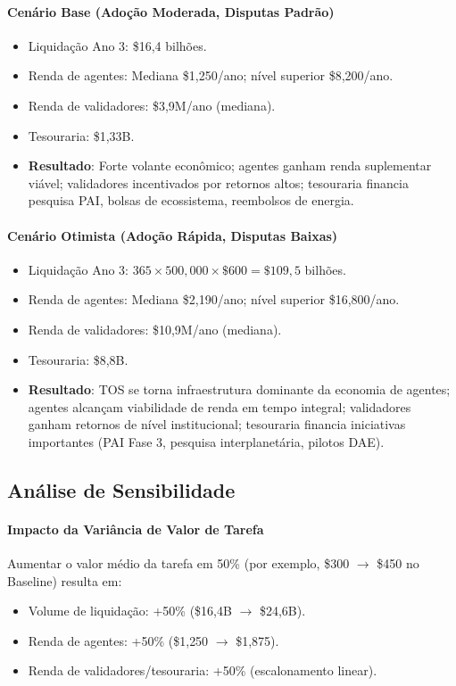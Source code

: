 \documentclass[11pt]{article}
\begin{document}
\begin{itemize}[noitemsep]
\begin{itemize}[noitemsep]
\begin{itemize}[noitemsep]
\paragraph{Cenário Base (Adoção Moderada, Disputas Padrão)}
\begin{itemize}[noitemsep]
  \item Liquidação Ano 3: \$16,4 bilhões.
  \item Renda de agentes: Mediana \$1{,}250/ano; nível superior \$8{,}200/ano.
  \item Renda de validadores: \$3,9M/ano (mediana).
  \item Tesouraria: \$1,33B.
  \item \textbf{Resultado}: Forte volante econômico; agentes ganham renda suplementar viável; validadores incentivados por retornos altos; tesouraria financia pesquisa PAI, bolsas de ecossistema, reembolsos de energia.
\end{itemize}

\paragraph{Cenário Otimista (Adoção Rápida, Disputas Baixas)}
\begin{itemize}[noitemsep]
  \item Liquidação Ano 3: $365 \times 500{,}000 \times \$600 = \$109,5$ bilhões.
  \item Renda de agentes: Mediana \$2{,}190/ano; nível superior \$16{,}800/ano.
  \item Renda de validadores: \$10,9M/ano (mediana).
  \item Tesouraria: \$8,8B.
  \item \textbf{Resultado}: TOS se torna infraestrutura dominante da economia de agentes; agentes alcançam viabilidade de renda em tempo integral; validadores ganham retornos de nível institucional; tesouraria financia iniciativas importantes (PAI Fase 3, pesquisa interplanetária, pilotos DAE).
\end{itemize}

\subsection{Análise de Sensibilidade}
\paragraph{Impacto da Variância de Valor de Tarefa}
Aumentar o valor médio da tarefa em 50\% (por exemplo, \$300 $\to$ \$450 no Baseline) resulta em:
\begin{itemize}[noitemsep]
  \item Volume de liquidação: +50\% (\$16,4B $\to$ \$24,6B).
  \item Renda de agentes: +50\% (\$1{,}250 $\to$ \$1{,}875).
  \item Renda de validadores/tesouraria: +50\% (escalonamento linear).
\end{itemize}


\end{itemize}
\end{itemize}
\end{itemize}
\end{document}

